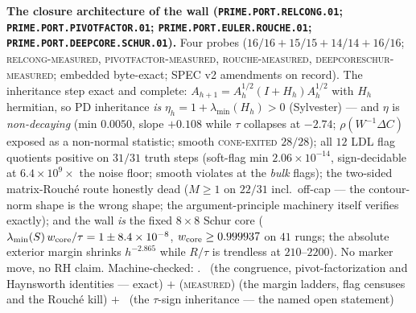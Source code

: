 \documentclass[11pt,a4paper]{article}
\theoremstyle{definition}
\begin{document}
\par\smallskip\noindent\textbf{The closure architecture of the
wall (\texttt{PRIME.PORT.\allowbreak RELCONG.01};
\texttt{PRIME.PORT.\allowbreak PIVOTFACTOR.01};
\texttt{PRIME.PORT.EULER.\allowbreak ROUCHE.01};
\texttt{PRIME.PORT.DEEPCORE.\allowbreak SCHUR.01}).}
Four probes ($16/16 + 15/15 + 14/14 + 16/16$;
\textsc{relcong-measured}, \textsc{pivotfactor-measured},
\textsc{rouche-measured}, \textsc{deepcoreschur-measured};
embedded byte-exact; SPEC v2 amendments on record).  The
inheritance step exact and complete: $A_{h+1} = A_h^{1/2}(I +
H_h)A_h^{1/2}$ with $H_h$ hermitian, so PD inheritance
\emph{is} $\eta_h = 1 + \lambda_{\min}(H_h) > 0$ (Sylvester)
--- and $\eta$ is \emph{non-decaying} (min $0.0050$, slope
$+0.108$ while $\tau$ collapses at $-2.74$; $\rho(W^{-1}\Delta
C)$ exposed as a non-normal statistic; smooth
\textsc{cone-exited} $28/28$); all $12$ LDL flag quotients
positive on $31/31$ truth steps (soft-flag min
$2.06\times10^{-14}$, sign-decidable at $6.4\times10^{9}\times$
the noise floor; smooth violates at the \emph{bulk} flags); the
two-sided matrix-Rouch\'e route honestly dead ($M \ge 1$ on
$22/31$ incl.\ off-cap --- the contour-norm shape is the wrong
shape; the argument-principle machinery itself verifies
exactly); and the wall \emph{is} the fixed $8\times8$ Schur
core ($\lambda_{\min}(S)\,w_{\rm core}/\tau = 1 \pm
8.4\times10^{-8}$, $w_{\rm core} \ge 0.999937$ on $41$ rungs;
the absolute exterior margin shrinks $h^{-2.865}$ while
$R/\tau$ is trendless at $210$--$2200$).  No marker move, no
RH claim.
Machine-checked: .
\mE\ (the congruence, pivot-factorization and Haynsworth
identities --- exact) $+$ (\textsc{measured}) (the margin
ladders, flag censuses and the Rouch\'e kill) $+$ \mO\ (the
$\tau$-sign inheritance --- the named open statement)
\par\smallskip
\end{document}
